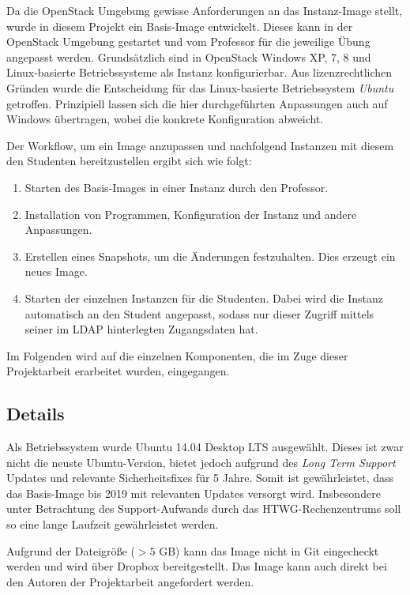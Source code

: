 Da die OpenStack Umgebung gewisse Anforderungen an das Instanz-Image stellt, wurde in diesem Projekt ein Basis-Image entwickelt. 
Dieses kann in der OpenStack Umgebung gestartet und vom Professor für die jeweilige Übung angepasst werden.
Grundsätzlich sind in OpenStack Windows XP, 7, 8 und Linux-basierte Betriebssysteme als Instanz konfigurierbar. 
Aus lizenzrechtlichen Gründen wurde die Entscheidung für das Linux-basierte Betriebssystem \emph{Ubuntu} getroffen. 
Prinzipiell lassen sich die hier durchgeführten Anpassungen auch auf Windows übertragen, wobei die konkrete Konfiguration abweicht.

Der Workflow, um ein Image anzupassen und nachfolgend Instanzen mit diesem den Studenten bereitzustellen ergibt sich wie folgt:

\begin{enumerate}
\item Starten des Basis-Images in einer Instanz durch den Professor.
\item Installation von Programmen, Konfiguration der Instanz und andere Anpassungen.
\item Erstellen eines Snapshots, um die Änderungen festzuhalten. Dies erzeugt ein neues Image.
\item Starten der einzelnen Instanzen für die Studenten. Dabei wird die Instanz automatisch an den Student angepasst, sodass nur dieser Zugriff mittels seiner im LDAP hinterlegten Zugangsdaten hat.
\end{enumerate}

Im Folgenden wird auf die einzelnen Komponenten, die im Zuge dieser Projektarbeit erarbeitet wurden, eingegangen. 

\subsection{Details}

Als Betriebssystem wurde Ubuntu 14.04 Desktop LTS ausgewählt. 
Dieses ist zwar nicht die neuste Ubuntu-Version, bietet jedoch aufgrund des \emph{Long Term Support} Updates und relevante Sicherheitsfixes für 5 Jahre. 
Somit ist gewährleistet, dass das Basis-Image bis 2019 mit relevanten Updates versorgt wird. 
Insbesondere unter Betrachtung des Support-Aufwands durch das HTWG-Rechenzentrums soll so eine lange Laufzeit gewährleistet werden.

Aufgrund der Dateigröße ($> 5$ GB) kann das Image nicht in Git eingecheckt werden und wird über Dropbox \cite{dropboxImage} bereitgestellt. Das Image kann auch direkt bei den Autoren der Projektarbeit angefordert werden.

